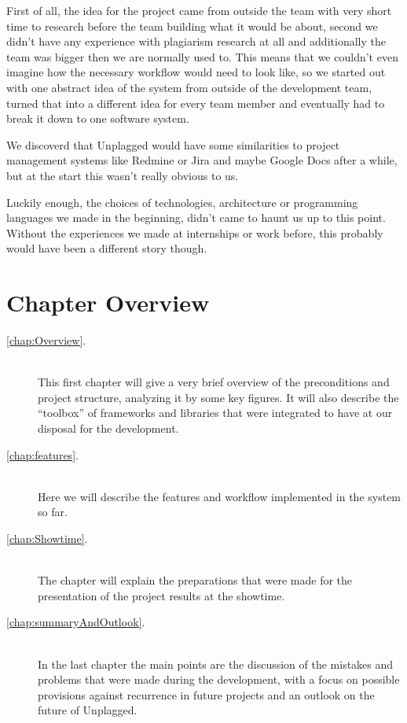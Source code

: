 First of all, the idea for the project came from outside the team with very short time to research before the team building what it would be 
about, second we didn't have any experience with plagiarism research at all and additionally the team was bigger then we are normally used to. 
This means that we couldn't even imagine how the necessary workflow would need to look like, so we started out with one abstract idea of the system 
from outside of the development team, turned that into a different idea for every team member and eventually had to break it down to one software system.

We discoverd that Unplagged would have some similarities to project management systems like Redmine or Jira and maybe Google Docs after a while, but at the start this wasn't really obvious to us.

Luckily enough, the choices of technologies, architecture or programming languages we made in the beginning, didn't came to haunt us up to this point. Without the experiences we made at internships or work before, this probably would have been a different story though.

\section*{Chapter Overview}

\begin{description}
\item[\ref{chap:Overview}. ] \hfill \\
This first chapter will give a very brief overview of the preconditions and project structure, analyzing it by some key figures. It will also describe the \enquote{toolbox} of
frameworks and libraries that were integrated to have at our disposal for the development.
\item[\ref{chap:features}. ] \hfill \\
Here we will describe the features and workflow implemented in the system so far.
\item[\ref{chap:Showtime}. ] \hfill \\
The chapter  will explain the preparations that were made for the presentation of the project results at the showtime.
\item[\ref{chap:summaryAndOutlook}. ] \hfill \\
In the last chapter the main points are the discussion of the mistakes and
problems that were made during the development, with a focus on possible provisions against recurrence in future projects and an
outlook on the future of Unplagged.
\end{description}

